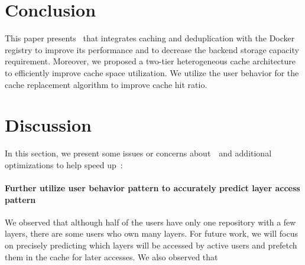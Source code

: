 \section{Conclusion}
\label{sec:conclusion}
This paper presents \sysname~that integrates caching and deduplication with the Docker registry to
improve its performance and to decrease the backend storage capacity requirement. 
Moreover, we proposed a two-tier heterogeneous cache architecture to efficiently improve cache space 
utilization. We utilize the user behavior for the cache replacement algorithm to improve cache hit ratio.


\section{Discussion}
\label{sec:discussion}
In this section, we present some issues or concerns about~\sysname~and additional optimizations to help speed up~\sysname:
\paragraph{Further utilize user behavior pattern to accurately predict layer access pattern}
We observed that although half of the users have only one repository with a few layers, there are some users who own many layers. 
For future work, we will focus on precisely predicting which layers will be accessed by active users and prefetch them in the cache for later accesses.
We also observed that 

